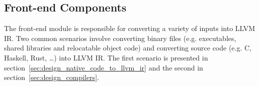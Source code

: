 
\subsection{Front-end Components}
\label{sec:design_front-end_components}

The front-end module is responsible for converting a variety of inputs into LLVM IR. Two common scenarios involve converting binary files (e.g. executables, shared libraries and relocatable object code) and converting source code (e.g. C, Haskell, Rust, …) into LLVM IR. The first scenario is presented in section~\ref{sec:design_native_code_to_llvm_ir} and the second in section~\ref{sec:design_compilers}.




